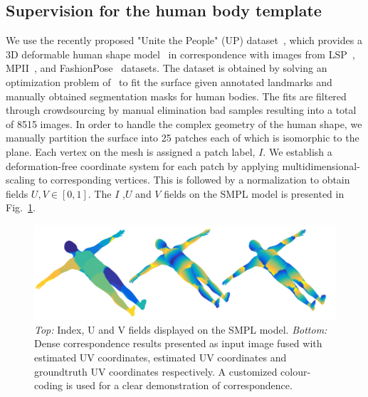 \subsection{Supervision for the human body template}

We use the recently proposed "Unite the People" (UP) dataset~\cite{lassner2017unite}, which provides a 3D deformable human shape model~\cite{loper2015smpl} in correspondence with images from LSP~\cite{Johnson10}, MPII~\cite{andriluka14cvpr}, and FashionPose~\cite{dantone2013human} datasets. The dataset is obtained by solving an optimization problem of~\cite{bogo2016keep} to fit the surface given annotated landmarks and manually obtained segmentation masks for human bodies. The fits are filtered through crowdsourcing by manual elimination bad samples resulting into a total of 8515 images.
%
In order to handle the complex geometry of the human shape, we manually partition the surface into 25 patches each of which is isomorphic to the plane. Each vertex on the mesh is assigned a patch label, $I$. We establish a deformation-free coordinate system for each patch by applying multidimensional-scaling to corresponding vertices. This is followed by a normalization to obtain fields $U,V \in [0,1]$.  The $I$ ,$U$ and $V$ fields on the SMPL model\cite{loper2015smpl} is presented in Fig.~\ref{fig:IUV}.
%

%
 

\begin{figure}[ht]
\begin{center}
   \includegraphics[width=1 \linewidth ]{resources/Human_Poses/IUV_Figure3}
\end{center}
   \caption{ \textit{Top:} Index, U and V fields displayed on the SMPL model. \textit{Bottom:} Dense correspondence results presented as input image fused with estimated UV coordinates, estimated UV coordinates and groundtruth UV coordinates respectively. A customized colour-coding is used for a clear demonstration of correspondence.}
\label{fig:IUV}
\end{figure}

 

